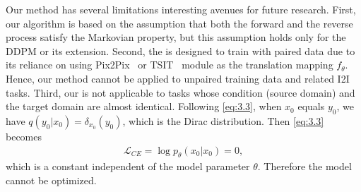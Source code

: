 Our \method method has several limitations  interesting avenues for future research.
%
First, our algorithm is based on the assumption that both the forward and the reverse process satisfy the Markovian property, but this assumption holds only for the DDPM or its extension. %
%
Second, the \method is designed to train with paired data due to its reliance on using  Pix2Pix~\cite{isola2017image} or TSIT~\cite{jiang2020tsit} module as the translation mapping $f_{\theta}$.
%
Hence, our method cannot be applied to unpaired training data and related I2I tasks.
%
Third, our \method is not applicable to tasks whose condition (source domain) and the target domain are almost identical. 
%
Following \cref{eq:3.3}, when $x_0$ equals $y_0$, we have $q(y_0|x_0) = \delta_{x_0}(y_0)$, which is the Dirac distribution.
%
Then\sqq{,} \cref{eq:3.3} becomes
%
\begin{align}
\mathcal L_{CE}=\log p_\theta(x_0|x_0) = 0,
\end{align}
%
which is a constant independent of the model parameter $\theta$. Therefore\sqq{,} the model cannot be optimized.
%
%
%




